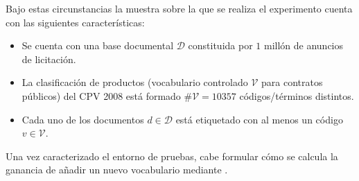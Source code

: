 Bajo estas circunstancias la muestra sobre la que se realiza el experimento cuenta con las siguientes características:
\begin{itemize}
 \item Se cuenta con una base documental $\mathcal{D}$ constituida por $1$ millón de anuncios de licitación.
 \item La clasificación de productos (vocabulario controlado $\mathcal{V}$ para contratos públicos) 
del CPV 2008 está formado $\#\mathcal{V} = 10357$ códigos/términos distintos.
 \item Cada uno de los documentos $d \in \mathcal{D}$ está etiquetado con al menos un código $v \in \mathcal{V}$.
\end{itemize}

Una vez caracterizado el entorno de pruebas, cabe formular cómo se calcula la ganancia de añadir un nuevo vocabulario 
mediante \linkeddata.
